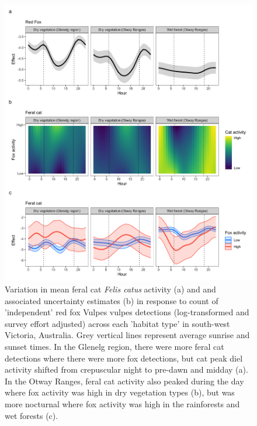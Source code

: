 \documentclass[11pt,a4paper,titlepage,twoside,openright]{style/unimelbthesis}
\begin{document}
\begin{mainmatter}
\begin{figure}
{\centering \includegraphics[width=1\linewidth]{figure/cat_fox_count} 

}

\caption{Variation in mean feral cat \textit{Felis catus} activity (a) and and associated uncertainty estimates (b) in response to count of ’independent’ red fox Vulpes vulpes detections (log-transformed and survey effort adjusted) across each ’habitat type’ in south-west Victoria, Australia. Grey vertical lines represent average sunrise and sunset times. In the Glenelg region, there were more feral cat detections where there were more fox detections, but cat peak diel activity shifted from crepuscular night to pre-dawn and midday (a). In the Otway Ranges, feral cat activity also peaked during the day where fox activity was high in dry vegetation types (b), but was more nocturnal where fox activity was high in the rainforests and wet forests (c).}\label{fig:diel-cat-fox}
\end{figure}
\newpage
\begin{figure}


\end{figure}
\end{mainmatter}
\end{document}
